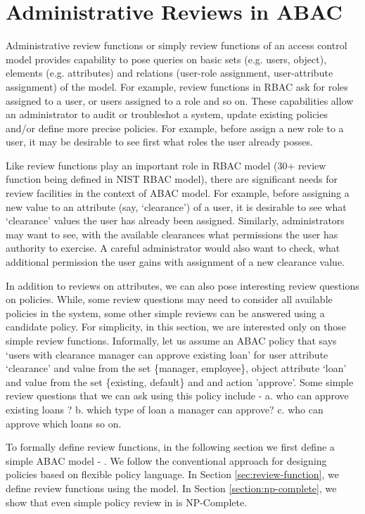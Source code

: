 \section{Administrative Reviews in ABAC}
Administrative review functions or simply review functions of an access control model provides capability to pose queries on basic sets (e.g. users, object), elements (e.g. attributes) and relations (user-role assignment, user-attribute assignment) of the model. For example, review functions in RBAC \cite{nist-rbac} ask for roles assigned to a user, or users assigned to a role and so on. These capabilities allow an administrator to audit or troubleshot  a system, update existing policies and/or define more precise policies. For example, before assign a new role to a user, it may be desirable to see first what roles the user already posses. 

Like review functions play an important role in RBAC model (30+ review function being defined in NIST RBAC model), there are significant needs for review facilities in the context of ABAC model. For example, before assigning a new value to an  attribute (say, `clearance') of a user, it is desirable to see what `clearance' values the user has already been assigned. Similarly, administrators may want to see, with the available clearances what permissions the user has authority to exercise. A careful administrator would also want to check, what additional permission the user gains with assignment of a new clearance value. 





In addition to reviews on attributes, we can also pose interesting review questions on policies. While, some review questions may need to consider all  available policies in the system, some other simple reviews can be answered using a candidate policy. For simplicity, in this section, we are interested only on those simple review functions. Informally, let us assume an ABAC policy that says `users with clearance manager can approve existing loan' for user attribute `clearance' and value from the set \{manager, employee\}, object attribute `loan' and value from the set  \{existing, default\} and  and action 'approve'. Some simple review questions that we can ask using this policy include - a. who can approve existing loans ? b. which type of loan a manager can approve? c. who can approve which loans so on.

To formally define review functions, in the following section we first define a simple ABAC model - \sABAC{}. We follow the conventional approach for designing policies based on flexible policy language. In Section \ref{sec:review-function}, we define review functions using the \sABAC{} model. In Section \ref{section:np-complete}, we show that even simple policy review in \sABAC{} is NP-Complete. 

	